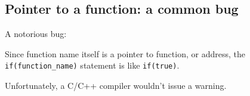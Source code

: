 \subsection{Pointer to a function: a common bug}

A notorious bug:



Since function name itself is a pointer to function, or address, 
the \verb|if(function_name)| statement is like \verb|if(true)|.

Unfortunately, a C/C++ compiler wouldn't issue a warning.

